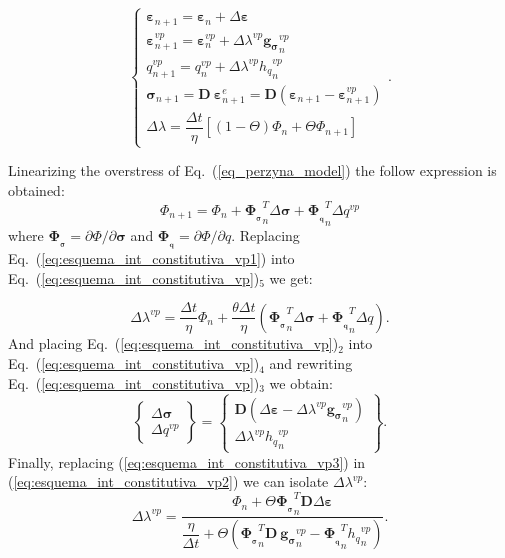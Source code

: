 \documentclass[Journal,letterpaper]{ascelike-new}
\newcommand{\dgds}{\boldsymbol{g_\sigma}}
\newcommand{\dPhidsl}{\boldsymbol{\Phi_{_\sigma}}}
\newcommand{\dPhidql}{\boldsymbol{\Phi_{_q}}}
\newcommand{\Dsdee}{\boldsymbol{D}}
\newcommand{\hl}{{h_q}}
\newcommand{\strain}{\boldsymbol{\varepsilon}}
\newcommand{\stress}{\boldsymbol{\sigma}}
\begin{document}
\begin{equation}
	\label{eq:esquema_int_constitutiva_vp}
	\left\{
	\begin{array}{lcl}
		\strain_{n+1} = \strain_n + \Delta \strain \\
		\strain_{n+1}^{vp} = \strain_n^{vp} + \Delta \lambda^{vp} \dgds_n^{vp} \\
		q_{n+1}^{vp} = q_n^{vp} + \Delta \lambda^{vp} \hl_n^{vp} \\	
		\stress_{n+1} = \Dsdee~\strain_{n+1}^e = \Dsdee(\strain_{n+1} - \strain_{n+1}^{vp}) \\
		\Delta \lambda = \dfrac{\Delta t}{\eta}[(1-\Theta)\Phi_n + \Theta \Phi_{n+1}]
	\end{array}
	\right..
\end{equation}

Linearizing the overstress of Eq.~(\ref{eq_perzyna_model}) the follow expression is obtained:
\begin{equation}
	\label{eq:esquema_int_constitutiva_vp1}
	\Phi_{n+1} = \Phi_n + \dPhidsl_n^T \Delta \stress + \dPhidql_n^T \Delta q^{vp}
\end{equation}
where $\dPhidsl = \partial \Phi / \partial \stress$ and $\dPhidql = \partial \Phi / \partial q$. Replacing  Eq.~(\ref{eq:esquema_int_constitutiva_vp1}) into Eq.~(\ref{eq:esquema_int_constitutiva_vp})$_5$ we get:

\begin{equation}
	\label{eq:esquema_int_constitutiva_vp2}
	\Delta \lambda^{vp} = \dfrac{\Delta t}{\eta} \Phi_n + \dfrac{\theta \Delta t}{\eta}(\dPhidsl_n^T \Delta \stress + \dPhidql_n^T \Delta q).
\end{equation}
And placing Eq.~(\ref{eq:esquema_int_constitutiva_vp})$_2$  into Eq.~(\ref{eq:esquema_int_constitutiva_vp})$_4$ and rewriting 
Eq.~(\ref{eq:esquema_int_constitutiva_vp})$_3$ we obtain:
\begin{equation}
	\label{eq:esquema_int_constitutiva_vp3}
	\left\{ \begin{array}{lcl} \Delta \stress \\ \Delta q^{vp} \end{array} \right\} = \left\{ \begin{array}{ccc} \Dsdee(\Delta\strain -\Delta \lambda^{vp} \dgds_n^{vp}) \\ \Delta \lambda^{vp} \hl_n^{vp} \end{array} \right\}.
\end{equation}
Finally, replacing (\ref{eq:esquema_int_constitutiva_vp3}) in (\ref{eq:esquema_int_constitutiva_vp2}) we can isolate $\Delta \lambda^{vp}$:
\begin{equation}
	\label{eq:esquema_int_constitutiva_vp4}
	\Delta \lambda^{vp} = \dfrac{\Phi_n + \Theta \dPhidsl_n^T\Dsdee\Delta\strain}{\dfrac{\eta}{\Delta t} + \Theta (\dPhidsl_n^T\Dsdee~\dgds_n^{vp} - \dPhidql_n^T \hl_n^{vp})}.
\end{equation}
\end{document}
